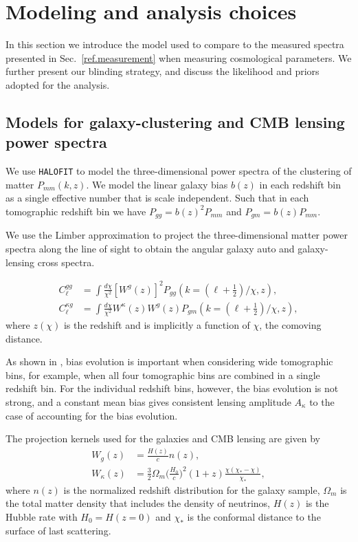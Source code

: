 \documentclass[twocolumn]{aastex631}
\begin{document}
{\section{Modeling and analysis choices}\label{sec.model}

In this section we introduce the model used to compare to the measured spectra presented in Sec.~\ref{ref.measurement} when measuring cosmological parameters. We further present our blinding strategy, and discuss the likelihood and priors adopted for the analysis.

\subsection{Models for galaxy-clustering and CMB lensing power spectra}



We use \texttt{HALOFIT} to model the three-dimensional power spectra of the clustering of matter $P_{mm}(k,z)$. We model the linear galaxy bias $b(z)$ in each redshift bin as a single effective number that is  scale independent. Such that in each tomographic redshift bin we have $P_{gg}=b(z)^2P_{mm}$ and $P_{{g}m}=b(z)P_{mm}$. 

We use the Limber approximation \citep{1953ApJ...117..134L,2008PhRvD..78l3506L} to project the three-dimensional matter power spectra along the line of sight to obtain the angular galaxy auto and galaxy-lensing cross spectra.

\begin{align}
    C^{gg}_\ell&=\int\frac{d\chi}{\chi^2}[W^g(z)]^2P_{gg}\left(k=\left(\ell+\frac{1}{2}\right)/\chi,z\right)\nonumber,\\C^{\kappa{g}}_\ell&=\int\frac{d\chi}{\chi^2}W^\kappa(z)W^g(z)P_{gm}\left(k=\left(\ell+\frac{1}{2}\right)/\chi,z\right),\label{eq:ggkg}
\end{align}
where $z(\chi)$ is the redshift and is implicitly a function of $\chi$,  the comoving distance. 


As shown in \cite{hang2021}, bias evolution is important when considering wide tomographic bins, for example, when all four tomographic bins are combined in a single redshift bin. For the individual redshift bins, however, the bias evolution is not strong, and a constant mean bias gives consistent lensing amplitude $A_{\kappa}$ to the case of accounting for the bias evolution. 

 The projection kernels used for the galaxies and CMB lensing are given by
\begin{align}
    W_g(z)&=\frac{H(z)}{c} n(z)\nonumber,
    \\
    {W_{\kappa}}(z)&=\frac{3}{2}\Omega_m\Big(\frac{H_0}{c}\Big)^2(1+z)\frac{\chi(\chi_*-\chi)}{\chi_*},
\end{align}
where $n(z)$ is the normalized redshift distribution for the galaxy sample, $\Omega_m$ is the total matter density that includes the density of neutrinos, $H(z)$ is the Hubble rate with $H_0=H(z=0)$ and $\chi_*$ is the conformal distance to the surface of last scattering.

}
\end{document}
